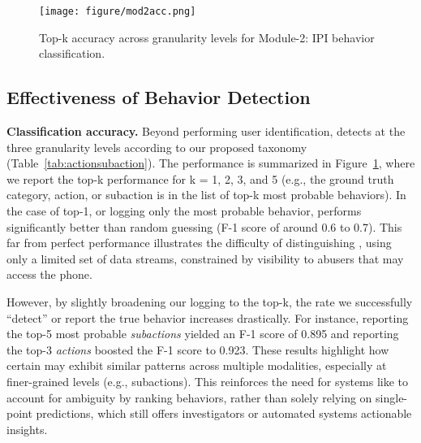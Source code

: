         \begin{figure}[htbp!]
            \centering\texttt{[image: figure/mod2acc.png]}%
        \caption{Top-k accuracy across granularity levels for Module-2: IPI behavior classification.}\label{fig:mod2acc}
        \end{figure}
        
\subsection{Effectiveness of Behavior Detection}

    \noindent\textbf{Classification accuracy.} Beyond performing user identification, \sys detects \ipvact at the three granularity levels according to our proposed taxonomy (Table~\ref{tab:actionsubaction}). The performance is summarized in Figure~\ref{fig:mod2acc}, where we report the top-k performance for k = 1, 2, 3, and 5 (e.g., the ground truth category, action, or subaction is in the list of top-k most probable behaviors). In the case of top-1, or logging only the most probable behavior, \sys performs significantly better than random guessing (F-1 score of around 0.6 to 0.7). This far from perfect performance illustrates the difficulty of distinguishing \ipvact, using only a limited set of data streams, constrained by visibility to abusers that may access the phone. 
    
    However, by slightly broadening our logging to the top-k, the rate we successfully ``detect'' or report the true behavior increases drastically. For instance, reporting the top-5 most probable \textit{subactions} yielded an F-1 score of 0.895 and reporting the top-3 \textit{actions} boosted the F-1 score to 0.923. These results highlight how certain \ipvact may exhibit similar patterns across multiple modalities, especially at finer-grained levels (e.g., subactions). This reinforces the need for systems like \sys to account for ambiguity by ranking behaviors, rather than solely relying on single-point predictions, which still offers investigators or automated systems actionable insights.%


